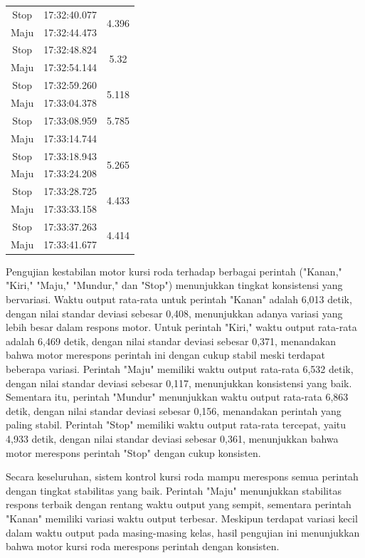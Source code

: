 \begin{longtable}{|c|c|c|}
  Stop           & 17:32:40.077        & \multirow{2}{*}{4.396}  \\ \cline{1-2}
  Maju           & 17:32:44.473        &                         \\ \hline
  Stop           & 17:32:48.824        & \multirow{2}{*}{5.32}   \\ \cline{1-2}
  Maju           & 17:32:54.144        &                         \\ \hline
  Stop           & 17:32:59.260        & \multirow{2}{*}{5.118}  \\ \cline{1-2}
  Maju           & 17:33:04.378        &                         \\ \hline
  Stop           & 17:33:08.959        & 5.785  \\ \hline
  Maju           & 17:33:14.744        &                         \\ \hline
  Stop           & 17:33:18.943        & \multirow{2}{*}{5.265}  \\ \cline{1-2}
  Maju           & 17:33:24.208        &                         \\ \hline
  Stop           & 17:33:28.725        & \multirow{2}{*}{4.433}  \\ \cline{1-2}
  Maju           & 17:33:33.158        &                         \\ \hline
  Stop           & 17:33:37.263        & \multirow{2}{*}{4.414}  \\ \cline{1-2}
  Maju           & 17:33:41.677        &                         \\ \hline
\end{longtable}

Pengujian kestabilan motor kursi roda terhadap berbagai perintah ("Kanan," "Kiri," "Maju," "Mundur," dan "Stop") menunjukkan tingkat konsistensi yang bervariasi. Waktu output rata-rata untuk perintah "Kanan" adalah 6,013 detik, dengan nilai standar deviasi sebesar 0,408, menunjukkan adanya variasi yang lebih besar dalam respons motor. Untuk perintah "Kiri," waktu output rata-rata adalah 6,469 detik, dengan nilai standar deviasi sebesar 0,371, menandakan bahwa motor merespons perintah ini dengan cukup stabil meski terdapat beberapa variasi. Perintah "Maju" memiliki waktu output rata-rata 6,532 detik, dengan nilai standar deviasi sebesar 0,117, menunjukkan konsistensi yang baik. Sementara itu, perintah "Mundur" menunjukkan waktu output rata-rata 6,863 detik, dengan nilai standar deviasi sebesar 0,156, menandakan perintah yang paling stabil. Perintah "Stop" memiliki waktu output rata-rata tercepat, yaitu 4,933 detik, dengan nilai standar deviasi sebesar 0,361, menunjukkan bahwa motor merespons perintah "Stop" dengan cukup konsisten.

Secara keseluruhan, sistem kontrol kursi roda mampu merespons semua perintah dengan tingkat stabilitas yang baik. Perintah "Maju" menunjukkan stabilitas respons terbaik dengan rentang waktu output yang sempit, sementara perintah "Kanan" memiliki variasi waktu output terbesar. Meskipun terdapat variasi kecil dalam waktu output pada masing-masing kelas, hasil pengujian ini menunjukkan bahwa motor kursi roda merespons perintah dengan konsisten.